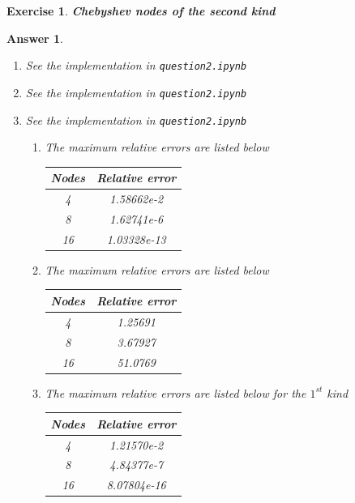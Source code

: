 \documentclass[12pt]{article}
\theoremstyle{colon}
\newtheorem{exercise}{Exercise}
\newtheorem*{answer}{Answer}
\begin{document}
\clearpage

\begin{exercise}
  \textbf{Chebyshev nodes of the second kind}
\end{exercise}

\begin{answer}
  \begin{enumerate}[label=\alph*)]

    \item See the implementation in \texttt{question2.ipynb}

    \item See the implementation in \texttt{question2.ipynb}

    \item See the implementation in \texttt{question2.ipynb}

      \begin{enumerate}[label=\roman*)]
        \item The maximum relative errors are listed below
          \begin{center}
            \begin{tabular}{ c | c }
              Nodes & Relative error \\
              \hline
              4 & 1.58662e-2 \\
              8 & 1.62741e-6 \\
              16 & 1.03328e-13 \\
            \end{tabular}
          \end{center}

        \item The maximum relative errors are listed below
          \begin{center}
            \begin{tabular}{ c | c }
              Nodes & Relative error \\
              \hline
              4 & 1.25691 \\
              8 & 3.67927 \\
              16 & 51.0769 \\
            \end{tabular}
          \end{center}

        \item The maximum relative errors are listed below for the $1^{st}$ kind
          \begin{center}
            \begin{tabular}{ c | c }
              Nodes & Relative error \\
              \hline
              4 & 1.21570e-2 \\
              8 & 4.84377e-7 \\
              16 & 8.07804e-16 \\
            \end{tabular}
          \end{center}


\end{enumerate}
\end{enumerate}
\end{answer}
\end{document}
